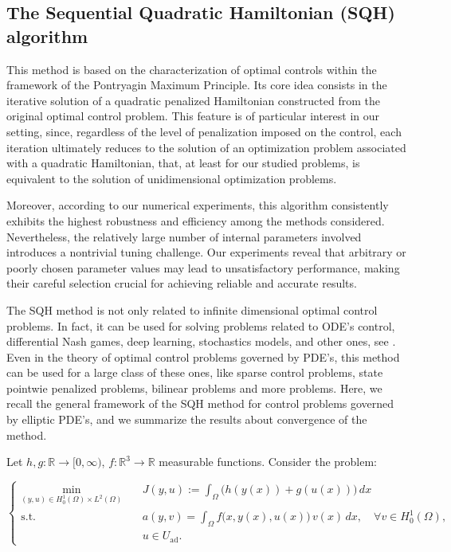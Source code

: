 \subsection{The Sequential Quadratic Hamiltonian (SQH) algorithm}

This method is based on the characterization of optimal controls within the framework of the Pontryagin Maximum Principle. Its core idea consists in the iterative solution of a quadratic penalized Hamiltonian constructed from the original optimal control problem. This feature is of particular interest in our setting, since, regardless of the level of penalization imposed on the control, each iteration ultimately reduces to the solution of an optimization problem associated with a quadratic Hamiltonian, that, at least for our studied problems, is equivalent to the solution of unidimensional optimization problems.

Moreover, according to our numerical experiments, this algorithm consistently exhibits the highest robustness and efficiency among the methods considered. Nevertheless, the relatively large number of internal parameters involved introduces a nontrivial tuning challenge. Our experiments reveal that arbitrary or poorly chosen parameter values may lead to unsatisfactory performance, making their careful selection crucial for achieving reliable and accurate results.

The SQH method is not only related to infinite dimensional optimal control problems. In fact, it can be used for solving problems related to ODE's control, differential Nash games, deep learning, stochastics models, and other ones, see \cite{borzi2023}. Even in the theory of optimal control problems governed by PDE's, this method can be used for a large class of these ones, like sparse control problems, state pointwie penalized problems, bilinear problems and more problems. Here, we recall the general framework of the SQH method for control problems governed by elliptic PDE's, and we summarize the results about convergence of the method.

Let $h, g:\mathbb{R}\to [0,\infty)$, $f:\mathbb{R}^3 \to \mathbb{R}$ measurable functions. Consider the problem:

\begin{subequations}\label{eq:sqh_framework_problem}
\begin{equation}
\left\{
\begin{aligned}
\min_{(y,u)\in H_0^1(\Omega)\times L^2(\Omega)} \quad 
& J(y,u) := \int_{\Omega}\big(h(y(x)) + g(u(x))\big)\,dx \\[0.5ex]
\text{s.t.}\quad 
& a(y,v) = \int_{\Omega} f\big(x,y(x),u(x)\big)\,v(x)\,dx,
\quad \forall v \in H_0^1(\Omega), \label{eq:variational_formulation_sqh}\\
& u \in U_{\mathrm{ad}}.
\end{aligned}
\right.
\end{equation}
\end{subequations}




